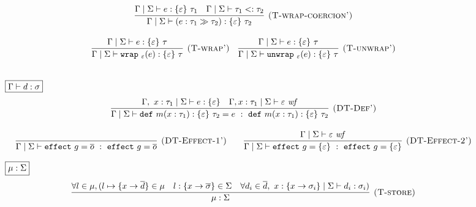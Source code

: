 \documentclass{article}
\newcommand{\keywadj}[1]{\mathtt{#1}}
\newcommand{\keyw}[1]{\keywadj{#1}~}
\begin{document}
\begin{figure}[H]
{\[\begin{array}{c}
    \infer[\textsc{(T-wrap-coercion')}]
  {\Gamma \mid \Sigma \vdash (e : \tau_1 \gg \tau_2) :  \{\varepsilon\} \ \tau_2}
  {\Gamma \mid \Sigma \vdash e :  \{\varepsilon\}\ \tau_1 & \Gamma \mid \Sigma \vdash \tau_1 <: \tau_2} \\[3ex]
  
  
  
      \infer[\textsc{(T-wrap')}]
  {\Gamma \mid \Sigma \vdash \keyw{wrap}_\varepsilon(e) : \{\varepsilon\}\ \tau}
  {\Gamma \mid \Sigma \vdash e : \{\varepsilon\}\  \tau} \quad 
  
      \infer[\textsc{(T-unwrap')}]
  {\Gamma \mid \Sigma \vdash \keyw{unwrap}_\varepsilon(e) :   \{\varepsilon\}\ \tau}
  {\Gamma \mid \Sigma \vdash e : \{\varepsilon\}\ \tau} \\[3ex]
\end{array} \\[3ex]
\]
}

\noindent$\fbox{$\Gamma \vdash d : \sigma$}$
\[
\begin{array}{c}
\infer[\textsc{(DT-Def')}]
  {\Gamma \mid \Sigma \vdash \keyw{def} m(x : \tau_1) : \{ \varepsilon \}~\tau_2 = e~:~\keyw{def} m(x : \tau_1) : \{ \varepsilon \}~\tau_2}
  { \Gamma,~x : \tau_1 \mid \Sigma \vdash e : \{ \varepsilon \} & \Gamma, x : \tau_1 \mid \Sigma \vdash \varepsilon~ \mathit{wf}  }\\[3ex]

\infer[\textsc{(DT-Effect-1')}]
  {\Gamma \mid \Sigma \vdash \keyw{effect} g = \overline{o} ~:~\keyw{effect} g =  \overline{o} }
  {} \quad \quad 
  
  
\infer[\textsc{(DT-Effect-2')}]
  {\Gamma\mid \Sigma \vdash \keyw{effect} g = \{ \varepsilon \}~:~\keyw{effect} g = \{ \varepsilon \}}
  {\Gamma\mid \Sigma \vdash \varepsilon~\mathit{wf}}
 
\end{array}\\[3ex]
\]



\noindent$\fbox{$\mu : \Sigma $}$
\[
\begin{array}{c}
      \infer[\textsc{(T-store)}]
  {\mu : \Sigma}
  {\forall l \in \mu, ( l \mapsto \{x \rightarrow \overline{d}\} \in \mu & l:\{x\rightarrow \overline{\sigma}\} \in \Sigma & \forall d_i\in \overline{d},\ x:\{x \rightarrow \sigma_i\} \mid \Sigma \vdash d_i : \sigma_i	)} 
\end{array} \\[3ex]
\]


\end{figure}
\end{document}
